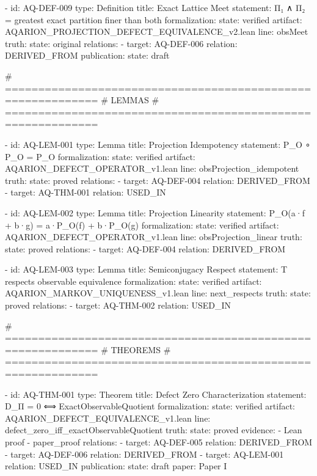   - id: AQ-DEF-009
    type: Definition
    title: Exact Lattice Meet
    statement: Π₁ ∧ Π₂ = greatest exact partition finer than both
    formalization:
      state: verified
      artifact: AQARION_PROJECTION_DEFECT_EQUIVALENCE_v2.lean
      line: obsMeet
    truth:
      state: original
    relations:
      - target: AQ-DEF-006
        relation: DERIVED_FROM
    publication:
      state: draft

  # ============================================================
  # LEMMAS
  # ============================================================

  - id: AQ-LEM-001
    type: Lemma
    title: Projection Idempotency
    statement: P_O ∘ P_O = P_O
    formalization:
      state: verified
      artifact: AQARION_DEFECT_OPERATOR_v1.lean
      line: obsProjection_idempotent
    truth:
      state: proved
    relations:
      - target: AQ-DEF-004
        relation: DERIVED_FROM
      - target: AQ-THM-001
        relation: USED_IN

  - id: AQ-LEM-002
    type: Lemma
    title: Projection Linearity
    statement: P_O(a·f + b·g) = a·P_O(f) + b·P_O(g)
    formalization:
      state: verified
      artifact: AQARION_DEFECT_OPERATOR_v1.lean
      line: obsProjection_linear
    truth:
      state: proved
    relations:
      - target: AQ-DEF-004
        relation: DERIVED_FROM

  - id: AQ-LEM-003
    type: Lemma
    title: Semiconjugacy Respect
    statement: T respects observable equivalence
    formalization:
      state: verified
      artifact: AQARION_MARKOV_UNIQUENESS_v1.lean
      line: next_respects
    truth:
      state: proved
    relations:
      - target: AQ-THM-002
        relation: USED_IN

  # ============================================================
  # THEOREMS
  # ============================================================

  - id: AQ-THM-001
    type: Theorem
    title: Defect Zero Characterization
    statement: D_Π = 0 ⟺ ExactObservableQuotient
    formalization:
      state: verified
      artifact: AQARION_DEFECT_EQUIVALENCE_v1.lean
      line: defect_zero_iff_exactObservableQuotient
    truth:
      state: proved
    evidence:
      - Lean proof
      - paper_proof
    relations:
      - target: AQ-DEF-005
        relation: DERIVED_FROM
      - target: AQ-DEF-006
        relation: DERIVED_FROM
      - target: AQ-LEM-001
        relation: USED_IN
    publication:
      state: draft
      paper: Paper I

